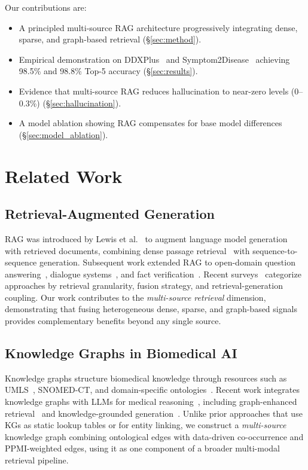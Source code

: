 \documentclass[preprint,12pt]{elsarticle}
\begin{document}
Our contributions are:
\begin{itemize}
    \item A principled multi-source RAG architecture progressively integrating dense, sparse, and graph-based retrieval (\S\ref{sec:method}).
    \item Empirical demonstration on DDXPlus~\cite{fansi2022ddxplus} and Symptom2Disease~\cite{gretelai_s2d} achieving 98.5\% and 98.8\% Top-5 accuracy (\S\ref{sec:results}).
    \item Evidence that multi-source RAG reduces hallucination to near-zero levels (0–0.3\%) (\S\ref{sec:hallucination}).
    \item A model ablation showing RAG compensates for base model differences (\S\ref{sec:model_ablation}).
\end{itemize}

\section{Related Work}
\label{sec:related}

\subsection{Retrieval-Augmented Generation}

RAG was introduced by Lewis et al.~\cite{lewis2020retrieval} to augment language model generation with retrieved documents, combining dense passage retrieval~\cite{karpukhin2020dense} with sequence-to-sequence generation. Subsequent work extended RAG to open-domain question answering~\cite{izacard2021leveraging}, dialogue systems~\cite{shuster2021retrieval}, and fact verification~\cite{thorne2018fever}. Recent surveys~\cite{gao2023retrieval,zhao2024retrieval} categorize approaches by retrieval granularity, fusion strategy, and retrieval-generation coupling. Our work contributes to the \emph{multi-source retrieval} dimension, demonstrating that fusing heterogeneous dense, sparse, and graph-based signals provides complementary benefits beyond any single source.

\subsection{Knowledge Graphs in Biomedical AI}

Knowledge graphs structure biomedical knowledge through resources such as UMLS~\cite{bodenreider2004unified}, SNOMED-CT, and domain-specific ontologies~\cite{santos2022knowledge,chandak2023building}. Recent work integrates knowledge graphs with LLMs for medical reasoning~\cite{pan2024unifying}, including graph-enhanced retrieval~\cite{he2024gretriever} and knowledge-grounded generation~\cite{yasunaga2022deep}. Unlike prior approaches that use KGs as static lookup tables or for entity linking, we construct a \emph{multi-source} knowledge graph combining ontological edges with data-driven co-occurrence and PPMI-weighted edges, using it as one component of a broader multi-modal retrieval pipeline.
\end{document}
